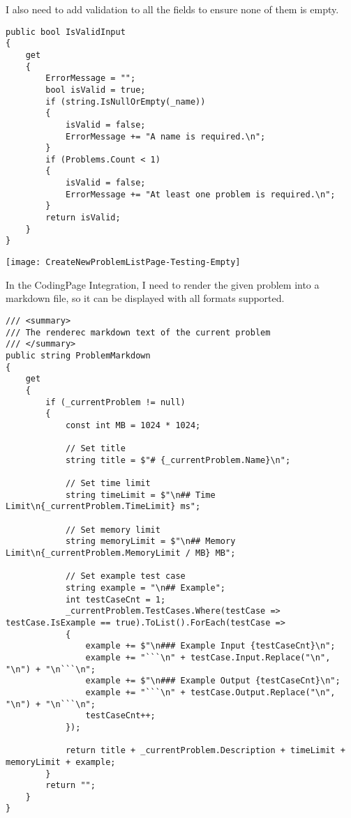 \documentclass[report.tex]{subfiles}
\begin{document}
I also need to add validation to all the fields to ensure none of them is empty.

\begin{verbatim}
public bool IsValidInput
{
    get
    {
        ErrorMessage = "";
        bool isValid = true;
        if (string.IsNullOrEmpty(_name))
        {
            isValid = false;
            ErrorMessage += "A name is required.\n";
        }
        if (Problems.Count < 1)
        {
            isValid = false;
            ErrorMessage += "At least one problem is required.\n";
        }
        return isValid;
    }
}
\end{verbatim}

\texttt{[image: CreateNewProblemListPage-Testing-Empty]}

In the CodingPage Integration, I need to render the given problem into a markdown file, so it can be displayed with all formats supported.

\begin{verbatim}
/// <summary>
/// The renderec markdown text of the current problem
/// </summary>
public string ProblemMarkdown
{
    get
    {
        if (_currentProblem != null)
        {
            const int MB = 1024 * 1024;
            
            // Set title
            string title = $"# {_currentProblem.Name}\n";
            
            // Set time limit
            string timeLimit = $"\n## Time Limit\n{_currentProblem.TimeLimit} ms";
            
            // Set memory limit
            string memoryLimit = $"\n## Memory Limit\n{_currentProblem.MemoryLimit / MB} MB";
            
            // Set example test case
            string example = "\n## Example";
            int testCaseCnt = 1;
            _currentProblem.TestCases.Where(testCase => testCase.IsExample == true).ToList().ForEach(testCase =>
            {
                example += $"\n### Example Input {testCaseCnt}\n";
                example += "```\n" + testCase.Input.Replace("\n", "\n") + "\n```\n";
                example += $"\n### Example Output {testCaseCnt}\n";
                example += "```\n" + testCase.Output.Replace("\n", "\n") + "\n```\n";
                testCaseCnt++;
            });

            return title + _currentProblem.Description + timeLimit + memoryLimit + example;
        }
        return "";
    }
}
\end{verbatim}
\end{document}
